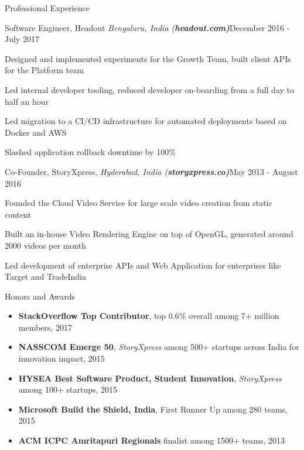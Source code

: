 \documentclass{resume}
\begin{document}
\begin{rSection}{Professional Experience}

\begin{rSubsection}{Software Engineer, Headout \it{Bengaluru, India} (\bf{headout.com})}{December 2016 - July 2017}{}{}
\item Designed and implemented experiments for the Growth Team, built client APIs for the Platform team
\item Led internal developer tooling, reduced developer on-boarding from a full day to half an hour
\item Led migration to a CI/CD infrastructure for automated deployments based on Docker and AWS
\item Slashed application rollback downtime by 100\%

\end{rSubsection}

\begin{rSubsection}{Co-Founder, StoryXpress, \it{Hyderabad, India} (\bf{storyxpress.co})}{May 2013 - August 2016}{}{}
\item Founded the Cloud Video Service for large scale video creation from static content
\item Built an in-house Video Rendering Engine on top of OpenGL, generated around 2000 videos per month
\item Led development of enterprise APIs and Web Application for enterprises like Target and TradeIndia

\end{rSubsection}

\end{rSection}

\begin{rSection}{Honors and Awards}
  \begin{itemize}[label={},topsep=0pt,itemsep=-0.5ex,partopsep=1ex,parsep=1ex,leftmargin=0.25em]
  \item  {\bf StackOverflow Top Contributor}, top 0.6\% overall among 7+ million members, 2017
  \item {\bf NASSCOM Emerge 50}, {\it StoryXpress} among 500+ startups across India for innovation impact, 2015
  \item {\bf HYSEA Best Software Product, Student Innovation}, {\it StoryXpress} among 100+ startups, 2015
  \item {\bf Microsoft Build the Shield, India}, First Runner Up among 280 teams, 2015
  \item {\bf ACM ICPC Amritapuri Regionals} finalist among 1500+ teams, 2013
  \end{itemize}
\end{rSection}
\end{document}
